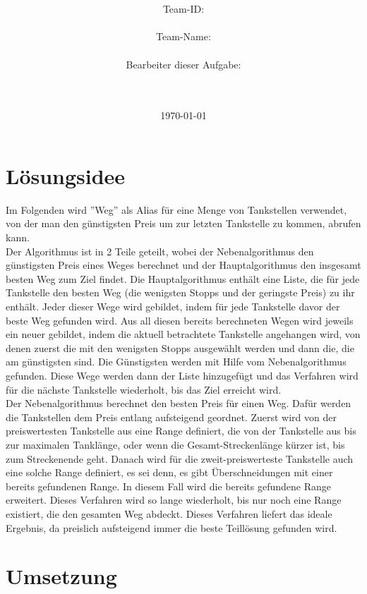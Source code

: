 \documentclass[a4paper,10pt,ngerman]{scrartcl}
\title{\textbf{\Huge\Aufgabe}}
\author{\LARGE Team-ID: \LARGE \TeamID \\\\
	    \LARGE Team-Name: \LARGE \TeamName \\\\
	    \LARGE Bearbeiter dieser Aufgabe: \\ 
	    \LARGE \Namen\\\\}
\date{\LARGE\today}
\begin{document}
\maketitle
\tableofcontents

\vspace{0.5cm}

\section{Lösungsidee}
Im Folgenden wird ''Weg'' als Alias für eine Menge von Tankstellen verwendet, von der man den günstigsten Preis um zur letzten Tankstelle zu kommen, abrufen kann. \\
Der Algorithmus ist in 2 Teile geteilt, wobei der Nebenalgorithmus den günstigsten Preis eines Weges berechnet und der Hauptalgorithmus den insgesamt besten Weg zum Ziel findet.
Die Hauptalgorithmus enthält eine Liste, die für jede Tankstelle den besten Weg (die wenigsten Stopps und der geringste Preis) zu ihr enthält. Jeder dieser Wege wird gebildet, indem für jede Tankstelle davor der beste Weg gefunden wird. Aus all diesen bereits berechneten Wegen wird jeweils ein neuer gebildet, indem die aktuell betrachtete Tankstelle angehangen wird, von denen zuerst die mit den wenigsten Stopps ausgewählt werden und dann die, die am günstigsten sind. Die Günstigsten werden mit Hilfe vom Nebenalgorithmus gefunden. Diese Wege werden dann der Liste hinzugefügt und das Verfahren wird für die nächste Tankstelle wiederholt, bis das Ziel erreicht wird. \\
Der Nebenalgorithmus berechnet den besten Preis für einen Weg. Dafür werden die Tankstellen dem Preis entlang aufsteigend geordnet. Zuerst wird von der preiswertesten Tankstelle aus eine Range definiert, die von der Tankstelle aus bis zur maximalen Tanklänge, oder wenn die Gesamt-Streckenlänge kürzer ist, bis zum Streckenende geht. Danach wird für die zweit-preiswerteste Tankstelle auch eine solche Range definiert, es sei denn, es gibt Überschneidungen mit einer bereits gefundenen Range. In diesem Fall wird die bereits gefundene Range erweitert. Dieses Verfahren wird so lange wiederholt, bis nur noch eine Range existiert, die den gesamten Weg abdeckt. Dieses Verfahren liefert das ideale Ergebnis, da preislich aufsteigend immer die beste Teillösung gefunden wird. 
\newpage
\section{Umsetzung}
\end{document}
